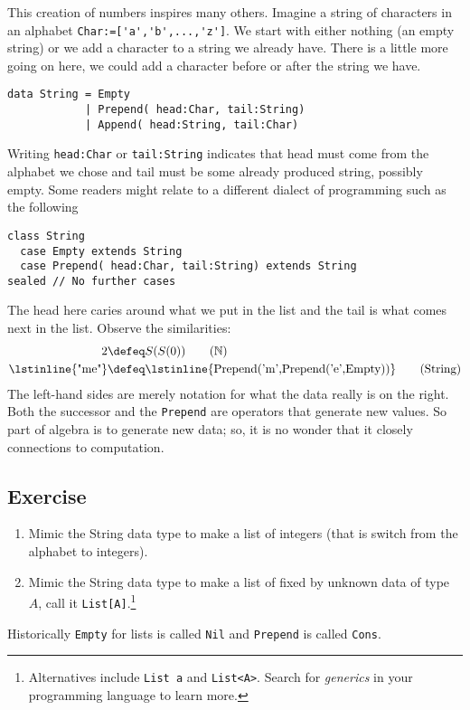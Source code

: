 This creation of numbers inspires many others.
Imagine a string of characters in an alphabet \lstinline{Char:=['a','b',...,'z']}.
We start with either nothing (an empty string) or we add a character 
to a string we already have.  There is a little more going on here, we 
could add a character before or after the string we have.
\begin{lstlisting}[language=Hidris]
data String = Empty 
            | Prepend( head:Char, tail:String) 
            | Append( head:String, tail:Char)
\end{lstlisting}
Writing \lstinline{head:Char} or \lstinline{tail:String} 
indicates that head must come from the alphabet we chose 
and tail must be some already produced string, possibly empty.
Some readers might relate to a different dialect of 
programming such as the following
\begin{lstlisting}[language=Sava]
class String
  case Empty extends String
  case Prepend( head:Char, tail:String) extends String
sealed // No further cases
\end{lstlisting}
The head here caries around what we put in the list and the tail 
is what comes next in the list.  Observe the similarities:
\begin{align}
     2 & \defeq S(S(0)) \tag{$\mathbb{N}$}\\
 \text{\lstinline{"me"}} & \defeq \text{\lstinline{Prepend('m',Prepend('e',Empty))}}
\tag{String}
\end{align}
The left-hand sides are merely notation for what the data really is on the right.
Both the successor and the \lstinline{Prepend} are operators that generate 
new values.  So part of algebra is to generate new data; so, it is no wonder 
that it closely connections to computation.

\subsection*{Exercise}
\begin{enumerate}
    \item Mimic the String data type to make a list of integers (that is 
    switch from the alphabet to integers).

    \item Mimic the String data type to make a list of fixed by 
    unknown data of type $A$, call it \lstinline{List[A]}.\footnote{
    Alternatives include \lstinline{List a} and \lstinline{List<A>}. 
    Search for \emph{generics} in your programming language to learn more.
    }

\end{enumerate}
Historically \lstinline{Empty} for lists is called \lstinline{Nil} 
and \lstinline{Prepend} is called \lstinline{Cons}.


